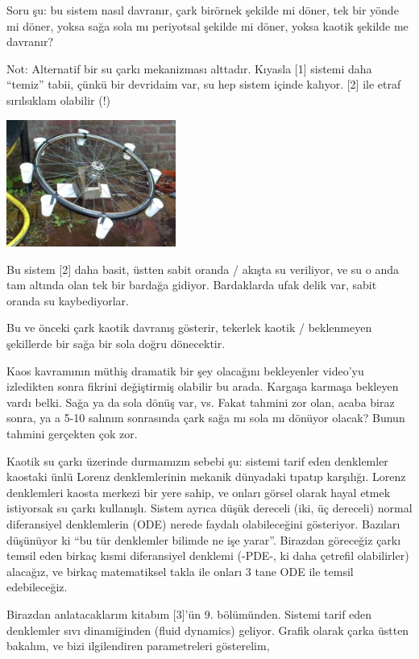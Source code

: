 \documentclass[12pt,fleqn]{article}\usepackage{../../common}
\begin{document}
Soru şu: bu sistem nasıl davranır, çark birörnek şekilde mi döner, tek bir
yönde mi döner, yoksa sağa sola mı periyotsal şekilde mi döner, yoksa
kaotik şekilde me davranır?

Not: Alternatif bir su çarkı mekanizması alttadır. Kıyasla [1] sistemi daha
``temiz'' tabii, çünkü bir devridaim var, su hep sistem içinde kalıyor. [2]
ile etraf sırılsıklam olabilir (!)

\includegraphics[width=15em]{waterwheelchaos.jpg}

Bu sistem [2] daha basit, üstten sabit oranda / akışta su veriliyor, ve su
o anda tam altında olan tek bir bardağa gidiyor. Bardaklarda ufak delik
var, sabit oranda su kaybediyorlar. 

Bu ve önceki çark kaotik davranış gösterir, tekerlek kaotik / beklenmeyen
şekillerde bir sağa bir sola doğru dönecektir. 

Kaos kavramının müthiş dramatik bir şey olacağını bekleyenler video'yu
izledikten sonra fikrini değiştirmiş olabilir bu arada. Kargaşa karmaşa
bekleyen vardı belki. Sağa ya da sola dönüş var, vs. Fakat tahmini zor
olan, acaba biraz sonra, ya a 5-10 salınım sonrasında çark sağa mı sola mı
dönüyor olacak? Bunun tahmini gerçekten çok zor.

Kaotik su çarkı üzerinde durmamızın sebebi şu: sistemi tarif eden
denklemler kaostaki ünlü Lorenz denklemlerinin mekanik dünyadaki tıpatıp
karşılığı. Lorenz denklemleri kaosta merkezi bir yere sahip, ve onları
görsel olarak hayal etmek istiyorsak su çarkı kullanışlı. Sistem ayrıca
düşük dereceli (iki, üç dereceli) normal diferansiyel denklemlerin (ODE)
nerede faydalı olabileceğini gösteriyor. Bazıları düşünüyor ki ``bu tür
denklemler bilimde ne işe yarar''. Birazdan göreceğiz çarkı temsil eden
birkaç kısmi diferansiyel denklemi (-PDE-, ki daha çetrefil olabilirler)
alacağız, ve birkaç matematiksel takla ile onları 3 tane ODE ile temsil
edebileceğiz.

Birazdan anlatacaklarım kitabım [3]'ün 9. bölümünden. Sistemi tarif eden
denklemler sıvı dinamiğinden (fluid dynamics) geliyor. Grafik olarak çarka
üstten bakalım, ve bizi ilgilendiren parametreleri gösterelim,
\end{document}
